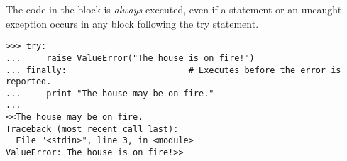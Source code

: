 The code in the  block is \emph{always} executed, even if a  statement or an uncaught exception occurs in any block following the try statement.

\begin{lstlisting}
>>> try:
...     raise ValueError("The house is on fire!")
... finally:                        # Executes before the error is reported.
...     print "The house may be on fire."
...
<<The house may be on fire.
Traceback (most recent call last):
  File "<stdin>", line 3, in <module>
ValueError: The house is on fire!>>
\end{lstlisting}

\begin{comment} %
\begin{warn} %
Having \li{except} by itself will catch \emph{any} exception raised in the \li{try} block, but this approach can mistakenly mask unexpected errors.
Consider the following function, which intends to avoid dividing by zero.

\begin{lstlisting}
>>> def divider(x, y):
...     try:
...         return x / float(yy)
...     except:
...         print("y must not equal zero!")
...
>>> divider(2, 3)
<<y must not equal zero!>>
\end{lstlisting}

Because \li{y} was misspelled, a \li{NameError} will be raised every time this function is called.
Be specific about the kind of exception you expect to encounter.

\begin{lstlisting}
>>> def divider(x, y):
...     try:
...         return x / float(yy)
...     except ZeroDivisionError:
...         print("y must not equal zero!")
...
>>> divider(2, 3)
<<Traceback (most recent call last):
  File "<stdin>", line 1, in <module>
  File "<stdin>", line 3, in divider
NameError: global name 'yy' is not defined>>
\end{lstlisting}
\end{warn}
\end{comment}

